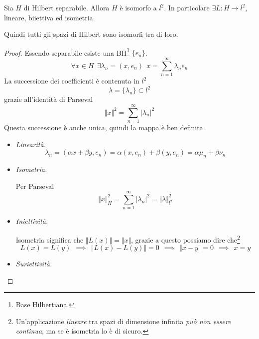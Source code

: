 \begin{thm}
Sia $H$ di Hilbert separabile. Allora $H$ è isomorfo a $l^{2}$. In particolare $\exists L: H\rightarrow l^{2}$, lineare, biiettiva ed isometria.
\end{thm}
\begin{rem}
Quindi tutti gli spazi di Hilbert sono isomorfi tra di loro.
\end{rem}
\begin{proof}

Essendo separabile esiste una BH\footnote{Base Hilbertiana.} $\{e_{n}\}$.
\begin{equation*}
\forall x\in H\ \ \exists \lambda_{n} = (x, e_{n}) \ \ x = \sum^{\infty}_{n = 1} \lambda_{n} e_{n}
\end{equation*}
La successione dei coefficienti è contenuta in $l^{2}$
\begin{equation*}
\lambda = \{\lambda_{n}\} \subset l^{2}
\end{equation*}
grazie all'identità di Parseval
\begin{equation*}
\Vert x \Vert^{2} = \sum\limits^{\infty}_{n = 1}| \lambda_{n}|^{2}
\end{equation*}
Questa successione è anche unica, quindi la mappa è ben definita.
\begin{itemize}
\item \textit{Linearità.}
\begin{equation*}
\lambda_{n} = (\alpha x + \beta y, e_{n}) = \alpha (x, e_{n}) + \beta (y, e_{n}) = \alpha \mu_{n} + \beta \nu_{n}
\end{equation*}
\item \textit{Isometria.}

Per Parseval
\begin{equation*}
\Vert x \Vert^{2}_{H} = \sum^{\infty}_{n = 1}| \lambda_{n}|^{2} = \Vert \lambda \Vert^{2}_{l^{2}}
\end{equation*}
\item \textit{Iniettività.}

Isometria significa che $ \Vert L(x) \Vert = \Vert x \Vert $, grazie a questo possiamo dire che\footnote{Un'applicazione \textit{lineare} tra spazi di dimensione infinita \textit{può non essere continua}, ma se è isometria lo è di sicuro.}
\begin{equation*}
L(x) = L(y) \ \ \implies \ \ \Vert L(x) - L(y) \Vert = 0\ \ \implies \ \ \Vert x - y \Vert = 0\ \ \implies \ \ x = y
\end{equation*}
\item \textit{Suriettività.}


\end{itemize}
\end{proof}
